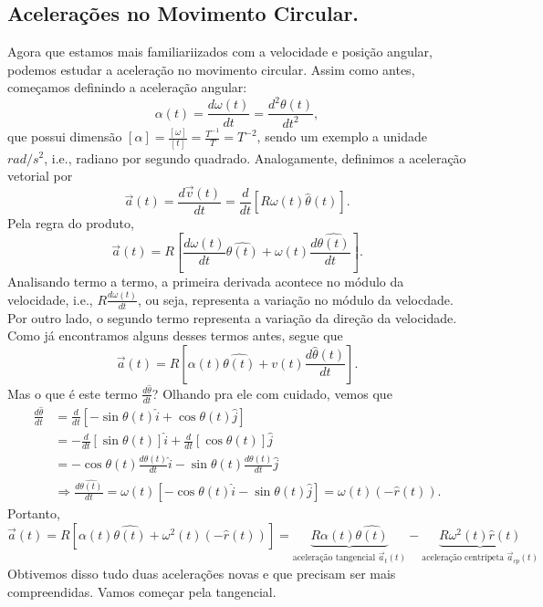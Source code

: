 \documentclass{article}
\begin{document}
  \subsection{Acelera\c c\~oes no Movimento Circular.}
      Agora que estamos mais familiariizados com a velocidade e posi\c c\~ao angular, podemos estudar a acelera\c c\~ao no movimento circular.
      Assim como antes, come\c camos definindo a acelera\c c\~ao angular: 
      $$
        \alpha(t) = \frac{d\omega(t)}{dt} = \frac{d^{2}\theta(t)}{dt^{2}},
      $$
      que possui dimens\~ao $[\alpha] = \frac{[\omega]}{[t]} = \frac{T^{-1}}{T} = T^{-2}$, sendo um exemplo a unidade $rad/s^{2}$, i.e.,
      radiano por segundo quadrado. Analogamente, definimos a acelera\c c\~ao vetorial por 
        $$
        \vec{a}(t) = \frac{d \vec{v}(t)}{dt} = \frac{d}{dt}[R\omega(t)\hat{\theta}(t)].
        $$
        Pela regra do produto, 
        $$
        \vec{a}(t) = R[\frac{d\omega(t)}{dt}\hat{\theta(t)} + \omega(t) \frac{d\hat{\theta(t)}}{dt}].
        $$
      Analisando termo a termo, a primeira derivada acontece no m\'odulo da velocidade, i.e., $R \frac{d\omega(t)}{dt}$, ou seja,
      representa a varia\c c\~ao no m\'odulo da velocdade. Por outro lado, o segundo termo representa a varia\c c\~ao da dire\c c\~ao 
      da velocidade. Como j\'a encontramos alguns desses termos antes, segue que 
        $$
        \vec{a}(t) = R[\alpha(t)\hat{\theta(t)} + v(t)\frac{d\hat{\theta}(t)}{dt}].
        $$
        Mas o que \'e este termo $\frac{d\hat{\theta}}{dt}$? Olhando pra ele com cuidado, vemos que 
       \begin{align*}
         \frac{d\hat{\theta}}{dt} &= \frac{d}{dt}[-\sin{\theta(t)}\hat{i} + \cos{\theta(t)}\hat{j}] \\
                                  &= -\frac{d}{dt}[\sin{\theta(t)}]\hat{i} + \frac{d}{dt}[\cos{\theta(t)}]\hat{j}\\
                                  &= -\cos{\theta(t)}\frac{d\theta(t)}{dt}\hat{i} -\sin{\theta(t)}\frac{d\theta(t)}{dt}\hat{j}\\
                                  &\Rightarrow \frac{d\hat{\theta(t)}}{dt} = \omega(t)[-\cos{\theta(t)}\hat{i} - \sin{\theta(t)}\hat{j}] = \omega(t)(-\hat{r}(t)).
       \end{align*}
     Portanto, 
       $$
         \vec{a}(t) = R[\alpha(t)\hat{\theta(t)} + \omega^{2}(t)(-\hat{r}(t))] = \underbrace{R\alpha(t)\hat{\theta(t)}}_{\text{acelera\c c\~ao tangencial }\vec{a}_{t}(t)} - \underbrace{R\omega^{2}(t)\hat{r}(t)}_{\text{acelera\c c\~ao centr\'ipeta }\vec{a}_{cp}(t)}
       $$
      Obtivemos disso tudo duas acelera\c c\~oes novas e que precisam ser mais compreendidas. Vamos come\c car pela tangencial.
\end{document}
